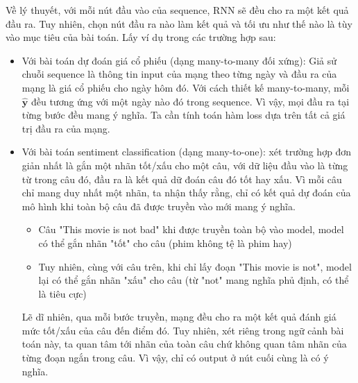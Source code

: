Về lý thuyết, với mỗi nút đầu vào của sequence, RNN sẽ đều cho ra một kết quả đầu ra. Tuy nhiên, chọn nút đầu ra nào làm kết quả và tối ưu như thế nào là tùy vào mục tiêu của bài toán. Lấy ví dụ trong các trường hợp sau:
\begin{itemize}
    \item Với bài toán dự đoán giá cổ phiếu (dạng many-to-many đối xứng): Giả sử chuỗi sequence là thông tin input của mạng theo từng ngày và đầu ra của mạng là giá cổ phiếu cho ngày hôm đó. Với cách thiết kế many-to-many, mỗi $\hat{\textbf{y}}$ đều tương ứng với một ngày nào đó trong sequence. Vì vậy, mọi đầu ra tại từng bước đều mang ý nghĩa. Ta cần tính toán hàm loss dựa trên tất cả giá trị đầu ra của mạng.
    \item Với bài toán sentiment classification (dạng many-to-one): xét trường hợp đơn giản nhất là gắn một nhãn tốt/xấu cho một câu, với dữ liệu đầu vào là từng từ trong câu đó, đầu ra là kết quả dữ đoán câu đó tốt hay xấu. Vì mỗi câu chỉ mang duy nhất một nhãn, ta nhận thấy rằng, chỉ có kết quả dự đoán của mô hình khi toàn bộ câu đã được truyền vào mới mang ý nghĩa.
          \begin{itemize}
              \item Câu "This movie is not bad" khi được truyền toàn bộ vào model, model có thể gắn nhãn "tốt" cho câu (phim không tệ là phim hay)
              \item Tuy nhiên, cùng với câu trên, khi chỉ lấy đoạn "This movie is not", model lại có thể gắn nhãn "xấu" cho câu (từ "not" mang nghĩa phủ định, có thể là tiêu cực)
          \end{itemize}
          Lẽ dĩ nhiên, qua mỗi bước truyền, mạng đều cho ra một kết quả đánh giá mức tốt/xấu của câu đến điểm đó. Tuy nhiên, xét riêng trong ngữ cảnh bài toán này, ta quan tâm tới nhãn của toàn câu chứ không quan tâm nhãn của từng đoạn ngắn trong câu. Vì vậy, chỉ có output ở nút cuối cùng là có ý nghĩa.
\end{itemize}

